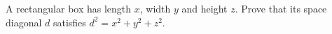A rectangular box has length $x$, width $y$ and height $z$. Prove that its space diagonal $d$ satisfies $d^2=x^2+y^2+z^2$.
